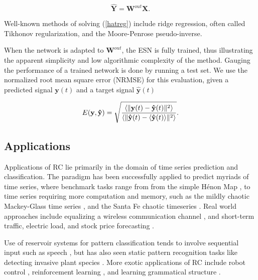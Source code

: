 \begin{equation}
  \mathbf{\hat{Y}} = \mathbf{W}^{out}\mathbf{X}.
  \label{hatreg}
\end{equation}

Well-known methods of solving (\ref{hatreg}) include ridge regression, often
called Tikhonov regularization, and the Moore-Penrose pseudo-inverse.

When the network is adapted to $\mathbf{W}^{out}$, the ESN is fully trained,
thus illustrating the apparent simplicity and low algorithmic complexity of the
method. Gauging the performance of a trained network is done by running a test
set. We use the normalized root mean square error (NRMSE) for this evaluation,
given a predicted signal $\mathbf{y}(t)$ and a target signal
$\mathbf{\hat{y}}(t)$

\begin{equation}
  E(\mathbf{y}, \mathbf{\hat{y}}) = \sqrt{\frac{
      \langle\Vert \mathbf{y}(t) - \mathbf{\hat{y}}(t) \Vert^{2}\rangle
    }{
      \langle\Vert \mathbf{\hat{y}}(t) - \langle\mathbf{\hat{y}}(t)\rangle \Vert^{2}\rangle
    }
  }
  .
  \label{nrmse}
\end{equation}


\subsection{Applications}

Applications of RC lie primarily in the domain of time series prediction and
classification. The paradigm has been successfully applied to predict myriads of
time series, where benchmark tasks range from from the simple H\'enon Map
\cite{goudarzi_comparative_2014}, to time series requiring more computation and
memory, such as the mildly chaotic Mackey-Glass time series
\cite{alippi_quantification_2009}, and the Santa Fe chaotic timeseries
\cite{rodan_minimum_2011}. Real world approaches include equalizing a wireless
communication channel \cite{jaeger_harnessing_2004}, and short-term traffic,
electric load, and stock price forecasting \cite{an_short-term_2011,
song_hourly_2011, lin_short-term_2009}.

Use of reservoir systems for pattern classification tends to involve sequential
input such as speech \cite{verstraeten_reservoir-based_2006}, but has also seen
static pattern recognition tasks like detecting invasive plant species
\cite{wootton_optimizing_2017}. More exotic applications of RC include robot
control \cite{aislan_antonelo_learning_2015}, reinforcement learning
\cite{bush_modeling_2005}, and learning grammatical structure
\cite{tong_learning_2007}.

